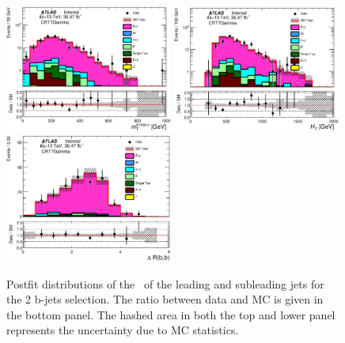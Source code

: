 \begin{figure}[htbp]
\begin{center}
\includegraphics[width=0.49\textwidth]{figures/ttGamma/postfit/MtBMaxPhoton_CRTTGamma_log.eps}
\includegraphics[width=0.49\textwidth]{figures/ttGamma/postfit/Ht_CRTTGamma_log.eps}
\includegraphics[width=0.49\textwidth]{figures/ttGamma/postfit/DRBB_CRTTGamma.eps}
\caption{\label{fig:ttV} Postfit distributions of the \pT\ of the
  leading and subleading jets for the 2 b-jets selection. The ratio between data and MC is given in the bottom panel. The hashed area in both the top and lower panel represents the uncertainty due to MC statistics.}
\end{center}
\end{figure}


